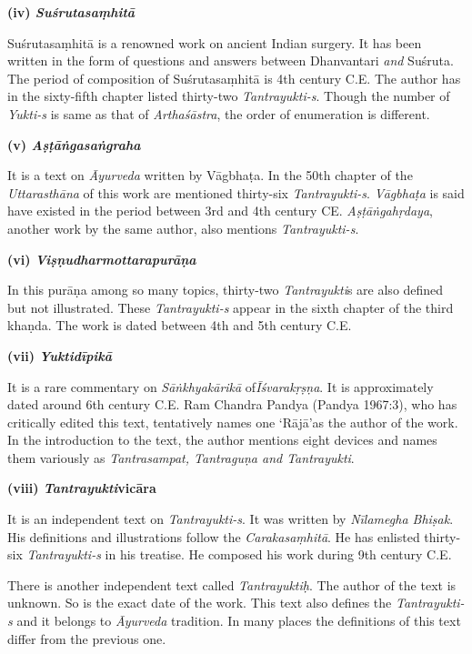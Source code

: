 \textbf{(iv) \textit{Suśrutasaṃhitā}}

Suśrutasaṃhitā is a renowned work on ancient Indian surgery. It has been written in the form of questions and answers between Dhanvantari \textit{and} Suśruta. The period of composition of Suśrutasaṃhitā is 4th century C.E. The author has in the sixty-fifth chapter listed thirty-two \textit{Tantrayukti-s}. Though the number of \textit{Yukti-s} is same as that of \textit{Arthaśāstra}, the order of enumeration is different.

\textbf{(v) \textit{Aṣṭāṅgasaṅgraha}}

It is a text on \textit{Āyurveda} written by Vāgbhaṭa. In the 50th chapter of the \textit{Uttarasthāna} of this work are mentioned thirty-six \textit{Tantrayukti-s}. \textit{Vāgbhaṭa} is said have existed in the period between 3rd and 4th century CE. \textit{Aṣṭāṅgahṛdaya}, another work by the same author, also mentions \textit{Tantrayukti-s}.

\textbf{(vi) \textit{Viṣṇudharmottarapurāṇa}}

In this purāṇa among so many topics, thirty-two \textit{Tantrayukti}s are also defined but not illustrated. These \textit{Tantrayukti-s} appear in the sixth chapter of the third khaṇda. The work is dated between 4th and 5th century C.E.

\textbf{(vii) \textit{Yuktidīpikā}}

It is a rare commentary on \textit{Sāṅkhyakārikā} of\textit{Īśvarakṛṣṇa}. It is approximately dated around 6th century C.E. Ram Chandra Pandya (Pandya 1967:3), who has critically edited this text, tentatively names one ‘Rājā’as the author of the work. In the introduction to the text, the author mentions eight devices and names them variously as \textit{Tantrasampat, Tantraguṇa and Tantrayukti}.

\textbf{(viii) \textit{Tantrayukti}vicāra}

It is an independent text on \textit{Tantrayukti-s}. It was written by \textit{Nīlamegha Bhiṣak}. His definitions and illustrations follow the \textit{Carakasaṃhitā}. He has enlisted thirty-six \textit{Tantrayukti-s} in his treatise. He composed his work during 9th century C.E.

There is another independent text called \textit{Tantrayuktiḥ}. The author of the text is unknown. So is the exact date of the work. This text also defines the \textit{Tantrayukti-s} and it belongs to \textit{Āyurveda} tradition. In many places the definitions of this text differ from the previous one. 

